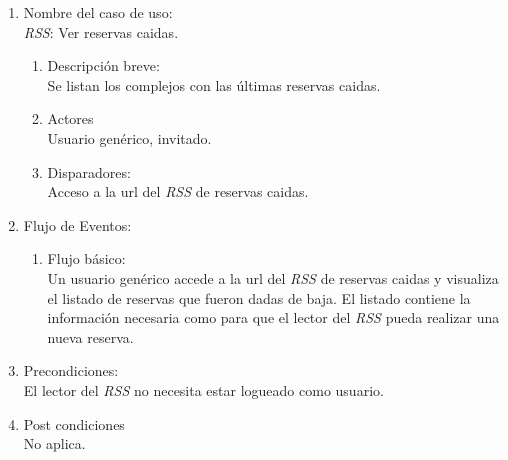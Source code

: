 \documentclass[a4paper,11pt]{article}
\begin{document}
\begin{enumerate}

	\item Nombre del caso de uso: \\
	\emph{RSS}: Ver reservas caidas.

	\begin{enumerate}
		\item Descripción breve: \\
			Se listan los complejos con las \'ultimas reservas caidas.
		\item Actores \\
			Usuario gen\'erico, invitado.
	
		\item Disparadores: \\
			Acceso a la url del \emph{RSS} de reservas caidas.

	\end{enumerate}

	\item Flujo de Eventos: \\

	\begin{enumerate}
		\item Flujo básico:\\
			Un usuario gen\'erico accede a la url del \emph{RSS}  de reservas caidas
			y visualiza el listado de reservas que fueron dadas de baja. El listado
			contiene la informaci\'on necesaria como para que el lector del \emph{RSS}
			pueda realizar una nueva reserva.
	\end{enumerate}

	\item Precondiciones: \\
		El lector del \emph{RSS} no necesita estar logueado como usuario.

	\item Post condiciones \\
		No aplica.

\end{enumerate}
\end{document}
